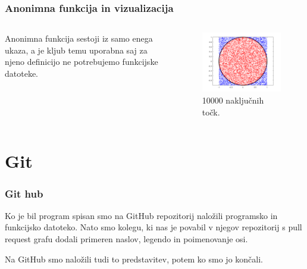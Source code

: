 \documentclass{beamer}
\begin{document}
\begin{frame}






\frametitle{Anonimna funkcija in vizualizacija}
\begin{columns}
\begin{column}{0.5\textwidth}
\justifying
        Anonimna funkcija sestoji iz samo enega ukaza, a je kljub temu uporabna saj za njeno definicijo ne potrebujemo funkcijske datoteke.
\end{column}
\begin{column}{0.5\textwidth}
    \begin{figure}
    \centering
        \includegraphics[width=1\textwidth]{Slike/Graf pi.png}
        \caption{10000 naključnih točk.}
    \end{figure}
\end{column}
\end{columns}




\end{frame}

\section{Git}

\begin{frame}
\frametitle{Git hub}
\justifying
Ko je bil program spisan smo na GitHub repozitorij naložili programsko in funkcijsko datoteko. Nato smo kolegu, ki nas je povabil v njegov repozitorij s pull request grafu dodali primeren naslov, legendo in poimenovanje osi. 

Na GitHub smo naložili tudi to predstavitev, potem ko smo jo končali.
\end{frame}
\end{document}
